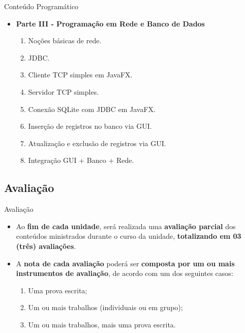 \documentclass{beamer}
\begin{document}
\begin{frame}{Conteúdo Programático}
    \begin{itemize}
        \justifying
        \item \textbf{Parte III - Programação em Rede e Banco de Dados}
            \begin{enumerate}
                \justifying
                \item Noções básicas de rede.
                \item JDBC.
                \item Cliente TCP simples em JavaFX.
                \item Servidor TCP simples.
                \item Conexão SQLite com JDBC em JavaFX.
                \item Inserção de registros no banco via GUI.
                \item Atualização e exclusão de registros via GUI.
                \item Integração GUI + Banco + Rede.
            \end{enumerate}
    \end{itemize}
\end{frame}

\subsection{Avaliação}

\begin{frame}{Avaliação}
    \begin{itemize}
        \justifying
        \item Ao \textbf{fim de cada unidade}, será realizada uma \textbf{avaliação parcial} dos conteúdos ministrados durante o curso da unidade, \alert{\textbf{totalizando em 03 (três) avaliações}}.
        \item A \textbf{nota de cada avaliação} poderá ser \textbf{composta por um ou mais instrumentos de avaliação}, de acordo com um dos seguintes casos:
        \begin{enumerate}
            \justifying
            \item Uma prova escrita;
            \item Um ou mais trabalhos (individuais ou em grupo);
            \item Um ou mais trabalhos, mais uma prova escrita.
        \end{enumerate}
    \end{itemize}
\end{frame}
\end{document}
